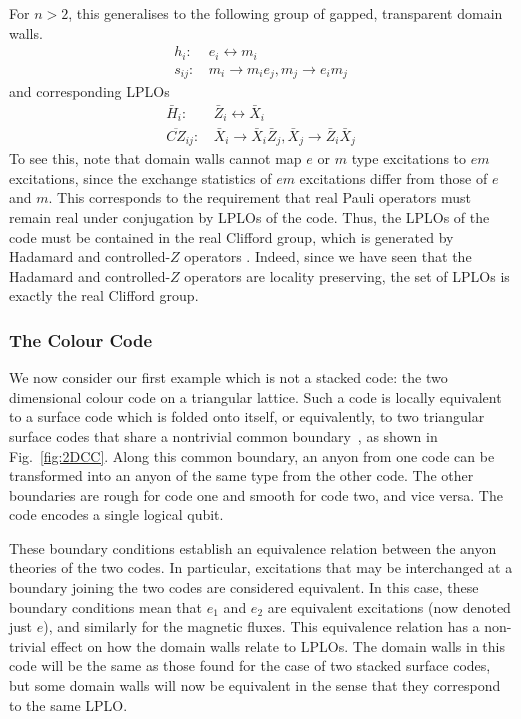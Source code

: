 \documentclass[pra,twocolumn,a4paper,nofootinbib]{revtex4-1}
\begin{document}
For $n>2$, this generalises to the following group of gapped, transparent domain walls.
\begin{align}
h_i: &\, e_i \leftrightarrow m_i\\
s_{ij}: &\, m_i \to m_ie_j, m_j \to e_i m_j
\end{align}
and corresponding LPLOs
\begin{align}
\bar{H}_i: &\, \bar{Z}_i \leftrightarrow \bar{X}_i\\
\overline{CZ}_{ij}: &\, \bar{X}_i \to \bar{X}_i\bar{Z}_j, \bar{X}_j \to \bar{Z}_i \bar{X}_j
\end{align}
To see this, note that domain walls cannot map $e$ or $m$ type excitations to $em$ excitations, since the exchange statistics of $em$ excitations differ from those of $e$ and $m$. This corresponds to the requirement that real Pauli operators must remain real under conjugation by LPLOs of the code. Thus, the LPLOs of the code must be contained in the real Clifford group, which is generated by Hadamard and controlled-$Z$ operators \cite{Gajewski}. Indeed, since we have seen that the Hadamard and controlled-$Z$ operators are locality preserving, the set of LPLOs is exactly the real Clifford group.

\subsubsection{The Colour Code}

We now consider our first example which is not a stacked code: the two dimensional colour code on a triangular lattice. Such a code is locally equivalent to a surface code which is folded onto itself, or equivalently, to two triangular surface codes that share a nontrivial common boundary~\cite{Kubica}, as shown in Fig.~\ref{fig:2DCC}. Along this common boundary, an anyon from one code can be transformed into an anyon of the same type from the other code. The other boundaries are rough for code one and smooth for code two, and vice versa. The code encodes a single logical qubit.

These boundary conditions establish an equivalence relation between the anyon theories of the two codes. In particular, excitations that may be interchanged at a boundary joining the two codes are considered equivalent. In this case, these boundary conditions mean that $e_1$ and $e_2$ are equivalent excitations (now denoted just $e$), and similarly for the magnetic fluxes.  This equivalence relation has a non-trivial effect on how the domain walls relate to LPLOs.  The domain walls in this code will be the same as those found for the case of two stacked surface codes, but some domain walls will now be equivalent in the sense that they correspond to the same LPLO.
\end{document}
